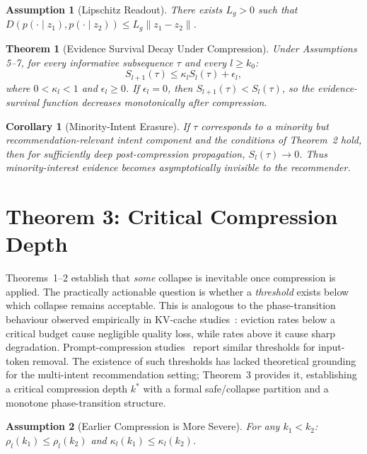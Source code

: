 \documentclass[lettersize,journal]{IEEEtran}
\newtheorem{theorem}{Theorem}
\newtheorem{assumption}{Assumption}
\newtheorem{corollary}{Corollary}
\begin{document}
\begin{assumption}[Lipschitz Readout]
There exists $L_g>0$ such that $D\!\left(p(\cdot\mid z_1), p(\cdot\mid z_2)\right) \le L_g \|z_1 - z_2\|$.
\end{assumption}

\begin{theorem}[Evidence Survival Decay Under Compression]
Under Assumptions 5--7, for every informative subsequence $\tau$ and every $l \ge k_0$:
\begin{equation}
S_{l+1}(\tau) \le \kappa_l S_l(\tau) + \epsilon_l,
\end{equation}
where $0<\kappa_l<1$ and $\epsilon_l \ge 0$. If $\epsilon_l=0$, then $S_{l+1}(\tau) < S_l(\tau)$, so the evidence-survival function decreases monotonically after compression.
\end{theorem}

\begin{corollary}[Minority-Intent Erasure]
If $\tau$ corresponds to a minority but recommendation-relevant intent component and the conditions of Theorem~2 hold, then for sufficiently deep post-compression propagation, $S_l(\tau)\to 0$. Thus minority-interest evidence becomes asymptotically invisible to the recommender.
\end{corollary}

\section{Theorem 3: Critical Compression Depth}

Theorems~1--2 establish that \emph{some} collapse is inevitable once compression is applied. The practically actionable question is whether a \emph{threshold} exists below which collapse remains acceptable. This is analogous to the phase-transition behaviour observed empirically in KV-cache studies~\cite{zhang2024h2o}: eviction rates below a critical budget cause negligible quality loss, while rates above it cause sharp degradation. Prompt-compression studies~\cite{jiang2023longllmlingua} report similar thresholds for input-token removal. The existence of such thresholds has lacked theoretical grounding for the multi-intent recommendation setting; Theorem~3 provides it, establishing a critical compression depth $k^*$ with a formal safe/collapse partition and a monotone phase-transition structure.

\begin{assumption}[Earlier Compression is More Severe]
For any $k_1<k_2$: $\rho_l(k_1) \le \rho_l(k_2)$ and $\kappa_l(k_1) \le \kappa_l(k_2)$.
\end{assumption}
\end{document}
